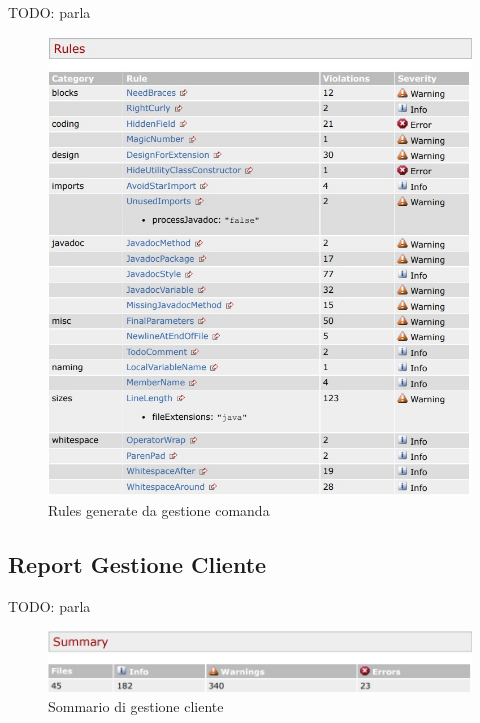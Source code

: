TODO: parla
\begin{figure}[htbp]
	\centering
	\includegraphics[scale=0.9]{iterazione1/images/Cs_rules_Gestione_Comanda.jpg}
	\caption{Rules generate da gestione comanda\label{fig:Cs_Rules_Gestione_Comanda}}
\end{figure}

\newpage

\subsection{Report Gestione Cliente}

TODO: parla
\begin{figure}[htbp]
	\centering
	\includegraphics[scale=0.6]{iterazione1/images/Cs_Summary_Gestione_Cliente.jpg}
	\caption{Sommario di gestione cliente\label{fig:Cs_Summary_Gestione_Cliente}}
\end{figure}

